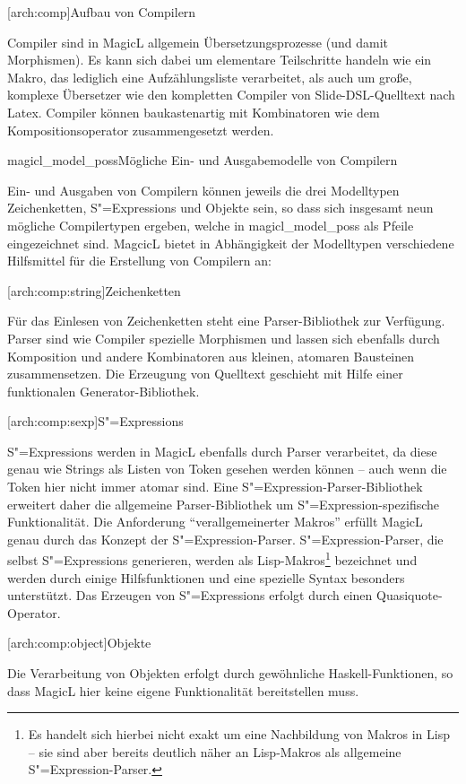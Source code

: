 \documentclass[12pt, a4paper, bibgerm]{scrbook}
\newcommand\lsection{}
\newcommand\lsubsubsection{}
\newcommand\abb{}
\newcommand\fig{}
\newcommand{\sexp}{S"=Expression}
\newcommand{\sexps}{S"=Expressions}
\begin{document}
\lsection[arch:comp]{Aufbau von Compilern}

Compiler sind in MagicL allgemein Übersetzungsprozesse (und damit
Morphismen). Es kann sich dabei um elementare Teilschritte handeln wie
ein Makro, das lediglich eine Aufzählungsliste verarbeitet, als auch um
große, komplexe Übersetzer wie den kompletten Compiler von
Slide-DSL-Quelltext nach Latex. Compiler können baukastenartig mit
Kombinatoren wie dem Kompositionsoperator zusammengesetzt werden.

\fig{magicl_model_poss}{Mögliche Ein- und Ausgabemodelle von Compilern}

Ein- und Ausgaben von Compilern können jeweils die drei Modelltypen
Zeichenketten, \sexps{} und Objekte sein, so dass sich insgesamt neun
mögliche Compilertypen ergeben, welche in \abb{magicl_model_poss} als
Pfeile eingezeichnet sind. MagcicL bietet in Abhängigkeit der
Modelltypen verschiedene Hilfsmittel für die Erstellung von Compilern
an:

\lsubsubsection[arch:comp:string]{Zeichenketten}

Für das Einlesen von Zeichenketten steht eine Parser-Bibliothek zur
Verfügung. Parser sind wie Compiler spezielle Morphismen und lassen sich
ebenfalls durch Komposition und andere Kombinatoren aus kleinen,
atomaren Bausteinen zusammensetzen. Die Erzeugung von Quelltext
geschieht mit Hilfe einer funktionalen Generator-Bibliothek.

\lsubsubsection[arch:comp:sexp]{\sexps}

\sexps{} werden in MagicL ebenfalls durch Parser verarbeitet, da diese
genau wie Strings als Listen von Token gesehen werden können -- auch
wenn die Token hier nicht immer atomar sind. Eine
\sexp{}-Parser-Bibliothek erweitert daher die allgemeine
Parser-Bibliothek um \sexp{}-spezifische Funktionalität. Die Anforderung
``verallgemeinerter Makros'' erfüllt MagicL genau durch das Konzept der
\sexp{}-Parser. \sexp{}-Parser, die selbst \sexps{} generieren, werden
als Lisp-Makros\footnote{Es handelt sich hierbei nicht exakt um eine
  Nachbildung von Makros in Lisp -- sie sind aber bereits deutlich näher
  an Lisp-Makros als allgemeine \sexp{}-Parser.} bezeichnet und werden
durch einige Hilfsfunktionen und eine spezielle Syntax besonders
unterstützt. Das Erzeugen von \sexps{} erfolgt durch einen
Quasiquote-Operator.

\lsubsubsection[arch:comp:object]{Objekte}

Die Verarbeitung von Objekten erfolgt durch gewöhnliche
Haskell-Funktionen, so dass MagicL hier keine eigene Funktionalität
bereitstellen muss. 
\end{document}
